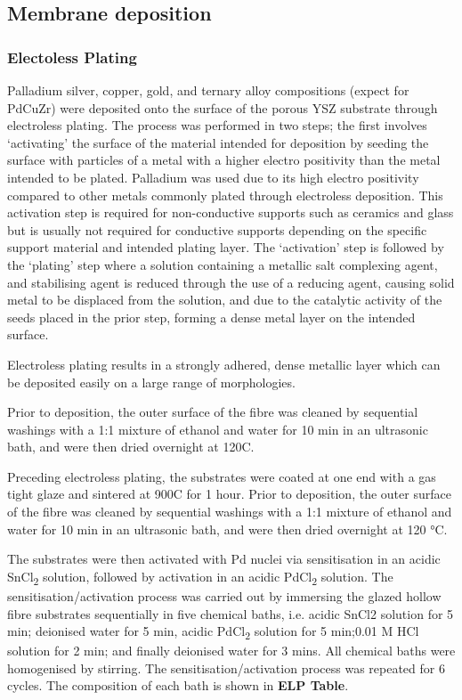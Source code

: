 \subsection{Membrane deposition}
\subsubsection{Electoless Plating}
Palladium silver, copper, gold, and ternary alloy compositions (expect for PdCuZr) were deposited onto the surface of the porous YSZ substrate through electroless plating. The process was performed in two steps; the first involves ‘activating’ the surface of the material intended for deposition by seeding the surface with particles of a metal with a 
higher electro positivity than the metal intended to be plated. Palladium was used due to its high electro positivity compared to other metals commonly plated through electroless deposition. This activation step is required for non-conductive supports such as ceramics and glass but is usually not required for conductive supports depending on the specific support material and intended plating layer. The ‘activation’ step is followed by the ‘plating’ step where a solution containing a metallic salt complexing agent, and stabilising agent is reduced through the use of a reducing agent, causing solid metal to be displaced from the 
solution, and due to the catalytic activity of the seeds placed in the prior step, forming a dense metal layer on the intended surface. 

Electroless plating results in a strongly adhered, dense metallic layer which can be deposited easily on a large range of morphologies.

Prior to deposition, the outer surface of the fibre was cleaned by sequential washings with a 1:1 mixture of ethanol and water for 10 min in an ultrasonic bath, and were then dried overnight at 120\textdegree C.

Preceding electroless plating, the substrates were coated at one end with a gas tight glaze and sintered at 900\textdegree C for 1 hour. Prior to deposition, the outer surface of the fibre was cleaned by sequential washings with a 1:1 mixture of ethanol and water for 10 min in an 
ultrasonic bath, and were then dried overnight at 120 °C.

The substrates were then activated with Pd nuclei via sensitisation in an acidic SnCl\textsubscript{2} solution, followed by activation in an acidic PdCl\textsubscript{2} solution. The sensitisation/activation 
process was carried out by immersing the glazed hollow fibre substrates sequentially in five chemical baths, i.e. acidic SnCl2 solution for 5 min; deionised water for 5 min, acidic PdCl\textsubscript{2} solution for 5 min;0.01 M HCl solution for 2 min; and finally deionised water for 3 mins. 
All chemical baths were homogenised by stirring. The sensitisation/activation process was repeated for 6 cycles. The composition of each bath is shown in \textbf{ELP Table}.

